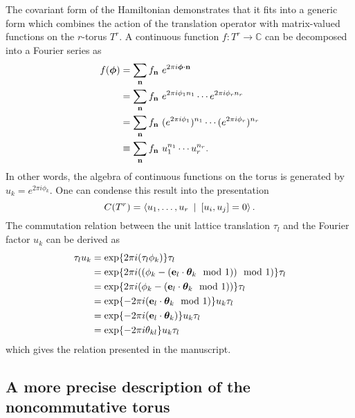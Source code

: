 \documentclass[
    aps,
    prb,
    twocolumn,
    floatfix,
    superscriptaddress,
	10pt
]{revtex4-2}
\begin{document}
The covariant form of the Hamiltonian demonstrates that it fits into a generic form which combines the action of the translation operator with matrix-valued functions on the $r$-torus $T^r$. 
A continuous function $f\colon T^r \to \mathbb{C}$ can be decomposed into a Fourier series as
\begin{align}
	f( \boldsymbol{\phi} ) & = \sum_{\vec{n} }  f_{\vec{n} }~ e^{2 \pi i \boldsymbol{\phi} \cdot \vec{n} }
	\notag \\
	& = \sum_{\vec{n} }  f_{\vec{n} }~ e^{2 \pi i \phi_1 n_1 } \cdots e^{2 \pi i \phi_r n_r }
	\notag \\
	& = \sum_{\vec{n} }  f_{\vec{n} } ~( e^{2 \pi i \phi_1  } )^{n_1} \cdots ( e^{2 \pi i \phi_r  } )^{n_r} 
	\notag \\
	& \equiv \sum_{\vec{n} }  f_{\vec{n} } ~u_1^{n_1} \cdots u_r^{n_r} .
\end{align}
In other words, the algebra of continuous functions on the torus is generated by $u_k = e^{2 \pi i \phi_k  }$.
One can condense this result into the presentation 
\begin{equation}
	C(T^r) = \Braket{ u_1, \ldots, u_r ~|~ [u_i, u_j] = 0} .
\end{equation}
The commutation relation between the unit lattice translation $\tau_l$ and the Fourier factor $u_k$ can be derived as
\begin{align}
	\tau_l u_k &=
	\exp\lbrace 
	2 \pi i  (\tau_l \phi_k )
	\rbrace \tau_l
	\\ \notag 
	&=
	\exp\lbrace 
	2 \pi  i ( ( \phi_k - ( \vec{e}_l \cdot \boldsymbol{\theta}_k \mod 1) ) \mod 1 )
	\rbrace \tau_l
	\\ \notag 
	&=
	\exp\lbrace 
	2 \pi  i  ( \phi_k - ( \vec{e}_l \cdot \boldsymbol{\theta}_k \mod 1))
	\rbrace \tau_l
	\\ \notag  &= 
	\exp\lbrace 
	-2 \pi  i ( \vec{e}_l \cdot \boldsymbol{\theta}_k \mod 1)
	\rbrace u_k \tau_l
	\\ \notag  &= 
	\exp\lbrace 
	-2 \pi  i  (\vec{e}_l \cdot \boldsymbol{\theta}_k )
	\rbrace u_k \tau_l
	\\ \notag  &= 
	\exp\lbrace 
	-2 \pi  i  \theta_{kl} 
	\rbrace u_k \tau_l 
\end{align}
which gives the relation presented in the manuscript.




\subsection{A more precise description of the noncommutative torus}
\end{document}
